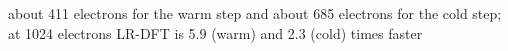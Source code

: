 about 411 electrons for the warm step and about 685 electrons for the cold step; at 1024 electrons LR-DFT is 5.9 (warm) and 2.3 (cold) times faster